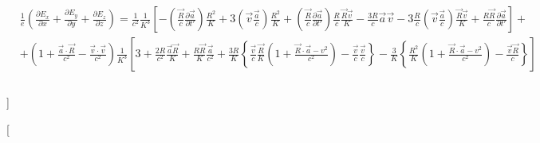 \documentclass[11pt]{article}
\begin{document}
\begin{align}
  & \frac{1}{e}\left( \frac{\partial {{E}_{x}}}{\partial x}+\frac{\partial {{E}_{y}}}{\partial y}+\frac{\partial {{E}_{z}}}{\partial z} \right)=\frac{1}{{{c}^{2}}}\frac{1}{{{K}^{3}}}\left[ -\left( \frac{\overrightarrow{R}}{c}\frac{\partial \overrightarrow{a}}{\partial t'} \right)\frac{{{R}^{2}}}{K}+3\left( \overrightarrow{v}\frac{\overrightarrow{a}}{c} \right)\frac{{{R}^{2}}}{K}+\left( \frac{\overrightarrow{R}}{c}\frac{\partial \overrightarrow{a}}{\partial t'} \right)\frac{R}{c}\frac{\overrightarrow{R}\overrightarrow{v}}{K}-\frac{3R}{c}\overrightarrow{a}\overrightarrow{v}-3\frac{R}{c}\left( \overrightarrow{v}\frac{\overrightarrow{a}}{c} \right)\frac{\overrightarrow{R}\overrightarrow{v}}{K}+\frac{R\overrightarrow{R}}{c}\frac{\partial \overrightarrow{a}}{\partial t'} \right]+ \\ 
 & +\left( 1+\frac{\overrightarrow{a}\cdot \overrightarrow{R}}{{{c}^{2}}}-\frac{\overrightarrow{v}\cdot \overrightarrow{v}}{{{c}^{2}}} \right)\frac{1}{{{K}^{3}}}\left[ 3+\frac{2R}{{{c}^{2}}}\frac{\overrightarrow{a}\overrightarrow{R}}{K}+\frac{R\overrightarrow{R}}{K}\frac{\overrightarrow{a}}{{{c}^{2}}}+\frac{3R}{K}\left\{ \frac{\overrightarrow{v}}{c}\frac{\overrightarrow{R}}{K}\left( 1+\frac{\overrightarrow{R}\cdot \overrightarrow{a}-{{v}^{2}}}{{{c}^{2}}} \right)-\frac{\overrightarrow{v}}{c}\frac{\overrightarrow{v}}{c} \right\}-\frac{3}{K}\left\{ \frac{{{R}^{2}}}{K}\left( 1+\frac{\overrightarrow{R}\cdot \overrightarrow{a}-{{v}^{2}}}{{{c}^{2}}} \right)-\frac{\overrightarrow{v}\overrightarrow{R}}{c} \right\} \right] \\ 
 &  \\ 
\end{align}

{]}

{[}
\end{document}
